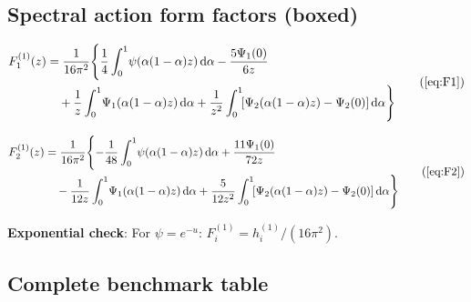\documentclass[11pt,a4paper]{article}
\newcommand{\dd}{\mathrm{d}}
\theoremstyle{definition}
\theoremstyle{remark}
\begin{document}
\subsection{Spectral action form factors (boxed)}

\begin{tcolorbox}[colback=green!5!white,colframe=green!50!black,
  title={\textbf{Vector spectral action form factors}}]
\begin{equation}
  \begin{aligned}
  F_1^{(1)}(z) &= \frac{1}{16\pi^2}\Biggl\{
    \frac{1}{4}\int_0^1\!\psi(\alpha(1-\alpha)z)\,\dd\alpha
    - \frac{5\Psi_1(0)}{6z}\\
  &\quad
    + \frac{1}{z}\int_0^1\!\Psi_1(\alpha(1-\alpha)z)\,\dd\alpha
    + \frac{1}{z^2}\int_0^1\![\Psi_2(\alpha(1-\alpha)z) - \Psi_2(0)]
    \,\dd\alpha
  \Biggr\}
  \end{aligned}
  \tag{\ref{eq:F1}}
\end{equation}

\begin{equation}
  \begin{aligned}
  F_2^{(1)}(z) &= \frac{1}{16\pi^2}\Biggl\{
    -\frac{1}{48}\int_0^1\!\psi(\alpha(1-\alpha)z)\,\dd\alpha
    + \frac{11\Psi_1(0)}{72z}\\
  &\quad
    - \frac{1}{12z}\int_0^1\!\Psi_1(\alpha(1-\alpha)z)\,\dd\alpha
    + \frac{5}{12z^2}\int_0^1\![\Psi_2(\alpha(1-\alpha)z) - \Psi_2(0)]
    \,\dd\alpha
  \Biggr\}
  \end{aligned}
  \tag{\ref{eq:F2}}
\end{equation}

\textbf{Exponential check}: For $\psi = e^{-u}$:
$F_i^{(1)} = h_i^{(1)}/(16\pi^2)$.
\end{tcolorbox}


\subsection{Complete benchmark table}
\end{document}
